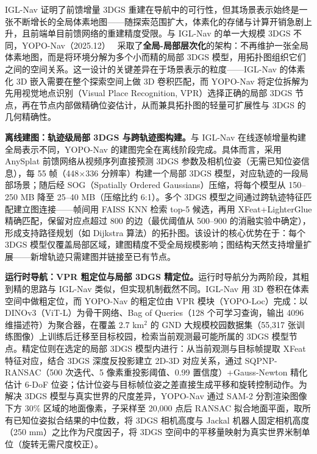 IGL-Nav 证明了前馈增量 3DGS 重建在导航中的可行性，但其场景表示始终是一张不断增长的全局体素地图——随探索范围扩大，体素化的存储与计算开销急剧上升，且前端单目前馈网络的重建精度受限。与 IGL-Nav 的单一大规模 3DGS 不同，YOPO-Nav（2025.12）~\cite{2512_09903} 采取了\textbf{全局-局部层次化}的架构：不再维护一张全局体素地图，而是将环境分解为多个小而精的局部 3DGS 模型，用拓扑图组织它们之间的空间关系。这一设计的关键差异在于场景表示的粒度——IGL-Nav 的体素化 3D 嵌入需要在整个探索空间上做 3D 卷积匹配，而 YOPO-Nav 将定位拆解为先用视觉地点识别（Visual Place Recognition, VPR）选择正确的局部 3DGS 节点，再在节点内部做精确位姿估计，从而兼具拓扑图的轻量可扩展性与 3DGS 的几何精确性。

\textbf{离线建图：轨迹级局部 3DGS 与跨轨迹图构建。}与 IGL-Nav 在线逐帧增量构建全局表示不同，YOPO-Nav 的建图完全在离线阶段完成。具体而言，采用 AnySplat 前馈网络从视频序列直接预测 3DGS 参数及相机位姿（无需已知位姿信息），每 55 帧（448$\times$336 分辨率）构建一个局部 3DGS 模型，对应轨迹的一段局部场景；随后经 SOG（Spatially Ordered Gaussians）压缩，将每个模型从 150--250 MB 降至 25--40 MB（压缩比约 6:1）。多个 3DGS 模型之间通过跨轨迹特征匹配建立图连接——帧间用 FAISS KNN 检索 top-5 候选，再用 XFeat+LighterGlue 精确匹配，保留对应点超过 800 的边（最优阈值从 500--900 的消融实验中确定），形成支持路径规划（如 Dijkstra 算法）的拓扑图。该设计的核心优势在于：每个 3DGS 模型仅覆盖局部区域，建图精度不受全局规模影响；图结构天然支持增量扩展——新增轨迹只需建图并链接至已有节点。

\textbf{运行时导航：VPR 粗定位与局部 3DGS 精定位。}运行时导航分为两阶段，其粗到精的思路与 IGL-Nav 类似，但实现机制截然不同。IGL-Nav 用 3D 卷积在体素空间中做粗定位，而 YOPO-Nav 的粗定位由 VPR 模块（YOPO-Loc）完成：以 DINOv3（ViT-L）为骨干网络、Bag of Queries（128 个可学习查询，输出 4096 维描述符）为聚合器，在覆盖 2.7 km$^2$ 的 GND 大规模校园数据集（55,317 张训练图像）上训练后迁移至目标校园，检索当前观测最可能所属的 3DGS 模型节点。精定位则在选定的局部 3DGS 模型内进行：从当前观测与目标帧提取 XFeat 特征对应，结合 3DGS 深度反投影建立 2D-3D 对应关系，通过 SQPNP-RANSAC（500 次迭代、5 像素重投影阈值、0.99 置信度）+Gauss-Newton 精化估计 6-DoF 位姿；估计位姿与目标帧位姿之差直接生成平移和旋转控制动作。为解决 3DGS 模型与真实世界的尺度差异，YOPO-Nav 通过 SAM-2 分割渲染图像下方 30\% 区域的地面像素，子采样至 20,000 点后 RANSAC 拟合地面平面，取所有已知位姿拟合结果的中位数，将 3DGS 相机高度与 Jackal 机器人固定相机高度（250 mm）之比作为尺度因子，将 3DGS 空间中的平移量映射为真实世界米制单位（旋转无需尺度校正）。

